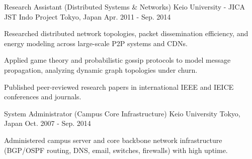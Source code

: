 \begin{cventries}
  \cventry
    {Research Assistant (Distributed Systems \& Networks)} %
    {Keio University - JICA JST Indo Project} %
    {Tokyo, Japan} %
    {Apr. 2011 - Sep. 2014} %
    {
      \begin{cvitems} %
        \item {Researched distributed network topologies, packet dissemination efficiency, and energy modeling across large-scale P2P systems and CDNs.}
        \item {Applied game theory and probabilistic gossip protocols to model message propagation, analyzing dynamic graph topologies under churn.}
        \item {Published peer-reviewed research papers in international IEEE and IEICE conferences and journals.}
      \end{cvitems}
    }

  \cventry
    {System Administrator (Campus Core Infrastructure)} %
    {Keio University} %
    {Tokyo, Japan} %
    {Oct. 2007 - Sep. 2014} %
    {
      \begin{cvitems} %
        \item {Administered campus server and core backbone network infrastructure (BGP/OSPF routing, DNS, email, switches, firewalls) with high uptime.}
      \end{cvitems}
    }

\end{cventries}
